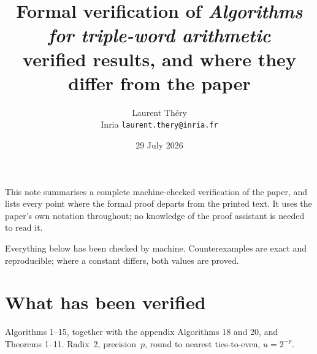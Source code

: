 \documentclass[11pt,a4paper]{article}
\title{Formal verification of \emph{Algorithms for triple-word arithmetic}\\[2pt]
       \large verified results, and where they differ from the paper}
\author{Laurent Théry\\\small Inria \quad\texttt{laurent.thery@inria.fr}}
\date{29 July 2026}
\begin{document}
\maketitle

\noindent
This note summarises a complete machine-checked verification of the paper, and
lists every point where the formal proof departs from the printed text. It uses
the paper's own notation throughout; no knowledge of the proof assistant is
needed to read it.

Everything below has been checked by machine. Counterexamples are exact and
reproducible; where a constant differs, both values are proved.

\section{What has been verified}

Algorithms 1--15, together with the appendix Algorithms 18 and 20, and
Theorems 1--11. Radix~2, precision~$p$, round to nearest ties-to-even,
$u = 2^{-p}$.
\end{document}
